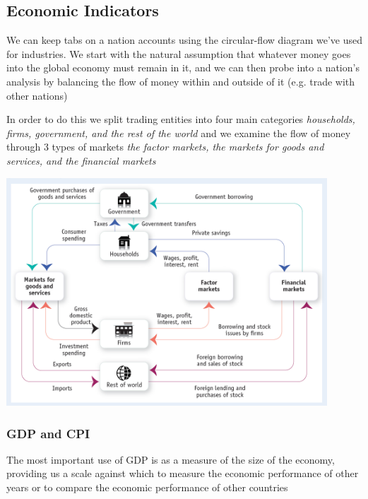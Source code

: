 \documentclass[english,course]{Notes}
\newcommand{\ita}[1]{\textit{#1}}
\begin{document}
\subsection{Economic Indicators}


\par{We can keep tabs on a nation accounts using the circular-flow diagram we've used for industries. We start with the natural assumption that whatever money goes into the global economy must remain in it, and we can then probe into a nation's analysis by balancing the flow of money within and outside of it (e.g. trade with other nations)}
\par{In order to do this we split trading entities into four main categories \ita{ households, firms, government, and the
rest of the world} and we examine the flow of money through 3 types of markets \ita{the factor
markets, the markets for goods and services, and the
financial markets} }

\includegraphics[width=0.9\textwidth]{macroFlow}

\subsubsection{GDP and CPI}




\par{ The most important use of GDP is as a measure of the size of the economy,
providing us a scale against which to measure the economic performance of
other years or to compare the economic performance of other countries}
\end{document}

